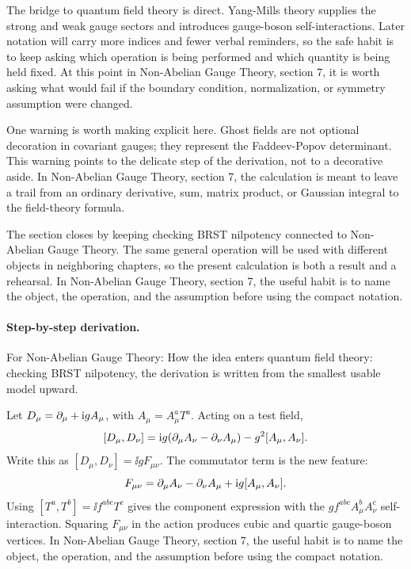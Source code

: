 The bridge to quantum field theory is direct.  Yang-Mills theory supplies the strong and weak gauge sectors and introduces gauge-boson self-interactions.  Later notation will carry more indices and fewer verbal reminders, so the safe habit is to keep asking which operation is being performed and which quantity is being held fixed.  At this point in Non-Abelian Gauge Theory, section 7, it is worth asking what would fail if the boundary condition, normalization, or symmetry assumption were changed.

One warning is worth making explicit here.  Ghost fields are not optional decoration in covariant gauges; they represent the Faddeev-Popov determinant.  This warning points to the delicate step of the derivation, not to a decorative aside.  In Non-Abelian Gauge Theory, section 7, the calculation is meant to leave a trail from an ordinary derivative, sum, matrix product, or Gaussian integral to the field-theory formula.

The section closes by keeping checking BRST nilpotency connected to Non-Abelian Gauge Theory.  The same general operation will be used with different objects in neighboring chapters, so the present calculation is both a result and a rehearsal.  In Non-Abelian Gauge Theory, section 7, the useful habit is to name the object, the operation, and the assumption before using the compact notation.



\paragraph{Step-by-step derivation.}

For Non-Abelian Gauge Theory: How the idea enters quantum field theory: checking BRST nilpotency, the derivation is written from the smallest usable model upward.

Let \(D_\mu=\partial_\mu+\mathrm i gA_\mu\), with \(A_\mu=A_\mu^aT^a\).  Acting on a test field,
\[
  [D_\mu,D_\nu]
  =
  \mathrm i g(\partial_\mu A_\nu-\partial_\nu A_\mu)-g^2[A_\mu,A_\nu].
\]
Write this as \([D_\mu,D_\nu]=\ii gF_{\mu\nu}\).  The commutator term is the new feature:
\[
  F_{\mu\nu}=\partial_\mu A_\nu-\partial_\nu A_\mu+\mathrm i g[A_\mu,A_\nu].
\]
Using \([T^a,T^b]=\ii f^{abc}T^c\) gives the component expression with the \(gf^{abc}A_\mu^bA_\nu^c\) self-interaction.  Squaring \(F_{\mu\nu}\) in the action produces cubic and quartic gauge-boson vertices.  In Non-Abelian Gauge Theory, section 7, the useful habit is to name the object, the operation, and the assumption before using the compact notation.

